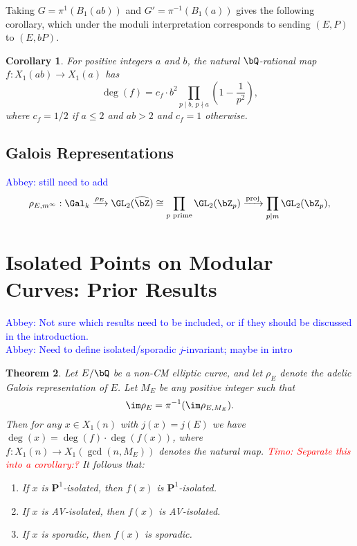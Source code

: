 \documentclass[11pt,reqno]{amsart}
\theoremstyle{plain}
\newtheorem{theorem}{Theorem}%
\newtheorem{corollary}[theorem]{Corollary}
\theoremstyle{definition}
\newcommand{\Q}{\bQ}
\newcommand{\Z}{\bZ}
\newcommand{\proj}{\operatorname{proj}}
\newcommand{\abbey}[1]{\textcolor{blue}{Abbey: #1}}
\newcommand{\timo}[1]{\textcolor{red}{Timo: #1}}
\begin{document}
Taking $G=\pi^{1}(B_1(ab))$ and $G'=\pi^{-1}(B_1(a))$ gives the following corollary, which under the moduli interpretation corresponds to sending $(E,P)$ to $(E,bP)$.    \begin{corollary}
                For positive integers $a$ and $b$, the natural $\Q$-rational map $f\colon X_1(ab) \rightarrow X_1(a)$ has
                \[
                    \deg(f)=
                    c_{f}\cdot b^2 \prod_{p \mid b,\, p \nmid a}
                    \left(1-\frac{1}{p^2}\right),
                \]
                where $c_{f}=1/2$ if $a \leq 2$ and $ab>2$ and $c_{f}=1$ otherwise. 
    \end{corollary}

\subsection{Galois Representations} \abbey{still need to add}
\[
\rho_{E,m^{\infty}}: \Gal_k \xrightarrow{\rho_E} \GL_2(\widehat{\Z}) \cong  \prod_{p \text{ prime}} \GL_2(\Z_{p}) \xrightarrow{\proj} \prod_{p \mid m} \GL_2(\Z_{p}),
\]



\section{Isolated Points on Modular Curves: Prior Results}
\abbey{Not sure which results need to be included, or if they should be discussed in the introduction.}\\
\abbey{Need to define isolated/sporadic $j$-invariant; maybe in intro}
\begin{theorem}
Let $E/\Q$ be a non-CM elliptic curve, and let $\rho_E$ denote the adelic Galois representation of $E$. Let $M_E$ be any positive integer such that
\[
\im \rho_E=\pi^{-1}(\im \rho_{E, M_E}).
\]
Then for any $x \in X_1(n)$ with $j(x)=j(E)$ we have $\deg(x)=\deg(f)\cdot \deg(f(x))$, where $f: X_1(n) \rightarrow X_1(\gcd(n,M_E))$ denotes the natural map. \timo{Separate this into a corollary:?} It follows that:
\begin{enumerate}
\item If $x$ is $\mathbf{P}^1$-isolated, then $f(x)$ is $\mathbf{P}^1$-isolated.
\item If $x$ is AV-isolated, then $f(x)$ is AV-isolated.
\item If $x$ is sporadic, then $f(x)$ is sporadic.
\end{enumerate}
\end{theorem}
\end{document}
